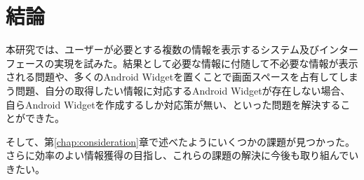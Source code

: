 \chapter{結論}
\label{chap:conclusion}

本研究では、ユーザーが必要とする複数の情報を表示するシステム及びインターフェースの実現を試みた。結果として必要な情報に付随して不必要な情報が表示される問題や、多くのAndroid Widgetを置くことで画面スペースを占有してしまう問題、自分の取得したい情報に対応するAndroid Widgetが存在しない場合、自らAndroid Widgetを作成するしか対応策が無い、といった問題を解決することができた。

そして、第\ref{chap:consideration}章で述べたようにいくつかの課題が見つかった。さらに効率のよい情報獲得の目指し、これらの課題の解決に今後も取り組んでいきたい。
